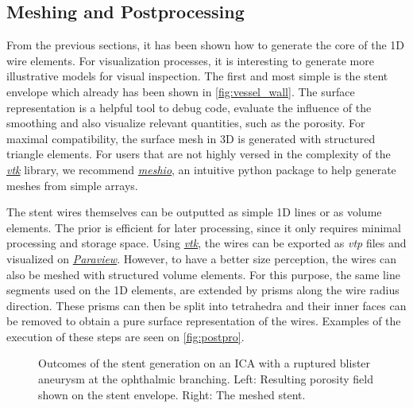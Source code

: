 \subsection{Meshing and Postprocessing}
From the previous sections, it has been shown how to generate the core of the 1D wire elements. For visualization processes, it is interesting to generate more illustrative models for visual inspection. The first and most simple is the stent envelope which already has been shown in \autoref{fig:vessel_wall}. The surface representation is a helpful tool to debug code, evaluate the influence of the smoothing and also visualize relevant quantities, such as the porosity. For maximal compatibility, the surface mesh in 3D is generated with structured triangle elements. For users that are not highly versed in the complexity of the \href{https://vtk.org/}{\textit{vtk}} library, we recommend \href{https://github.com/nschloe/meshio}{\textit{meshio}}, an intuitive python package to help generate meshes from simple arrays.

The stent wires themselves can be outputted as simple 1D lines or as volume elements. The prior is efficient for later processing, since it only requires minimal processing and storage space. Using \href{https://vtk.org/}{\textit{vtk}}, the wires can be exported as \textit{vtp} files and visualized on \href{https://www.paraview.org/}{\textit{Paraview}}. However, to have a better size perception, the wires can also be meshed with structured volume elements. For this purpose, the same line segments used on the 1D elements, are extended by prisms along the wire radius direction. These prisms can then be split into tetrahedra and their inner faces can be removed to obtain a pure surface representation of the wires. Examples of the execution of these steps are seen on \autoref{fig:postpro}.
\begin{figure}[htb]
	\centering
	
	\vspace*{-0.75cm}
	\caption[Output of stent model]{Outcomes of the stent generation on an ICA with a ruptured blister aneurysm at the ophthalmic branching. Left: Resulting porosity field shown on the stent envelope. Right: The meshed stent.}\label{fig:postpro}
\end{figure}

